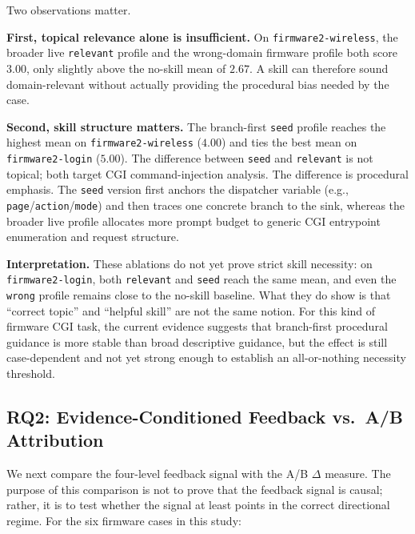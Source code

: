 ﻿\documentclass[preprint,12pt]{elsarticle}
\begin{document}
Two observations matter.

\textbf{First, topical relevance alone is insufficient.}  On
\texttt{firmware2-wireless}, the broader live \texttt{relevant} profile and
the wrong-domain firmware profile both score $3.00$, only slightly above
the no-skill mean of $2.67$.  A skill can therefore sound domain-relevant
without actually providing the procedural bias needed by the case.

\textbf{Second, skill structure matters.}  The branch-first
\texttt{seed} profile reaches the highest mean on
\texttt{firmware2-wireless} ($4.00$) and ties the best mean on
\texttt{firmware2-login} ($5.00$).  The difference between
\texttt{seed} and \texttt{relevant} is not topical; both target CGI
command-injection analysis.  The difference is procedural emphasis.  The
\texttt{seed} version first anchors the dispatcher variable (e.g.,
\texttt{page}/\texttt{action}/\texttt{mode}) and then traces one concrete
branch to the sink, whereas the broader live profile allocates more prompt
budget to generic CGI entrypoint enumeration and request structure.

\textbf{Interpretation.}  These ablations do not yet prove strict skill
necessity: on \texttt{firmware2-login}, both \texttt{relevant} and
\texttt{seed} reach the same mean, and even the \texttt{wrong} profile
remains close to the no-skill baseline.  What they do show is that
``correct topic'' and ``helpful skill'' are not the same notion.  For this
kind of firmware CGI task, the current evidence suggests that branch-first
procedural guidance is more stable than broad descriptive guidance, but the
effect is still case-dependent and not yet strong enough to establish an
all-or-nothing necessity threshold.

\subsection{RQ2: Evidence-Conditioned Feedback vs.\ A/B Attribution}
\label{sec:results_rq2}

We next compare the four-level feedback signal with the A/B $\Delta$
measure.  The purpose of this comparison is not to prove that the feedback
signal is causal; rather, it is to test whether the signal at least points
in the correct directional regime.  For the six firmware cases in this
study:
\end{document}

